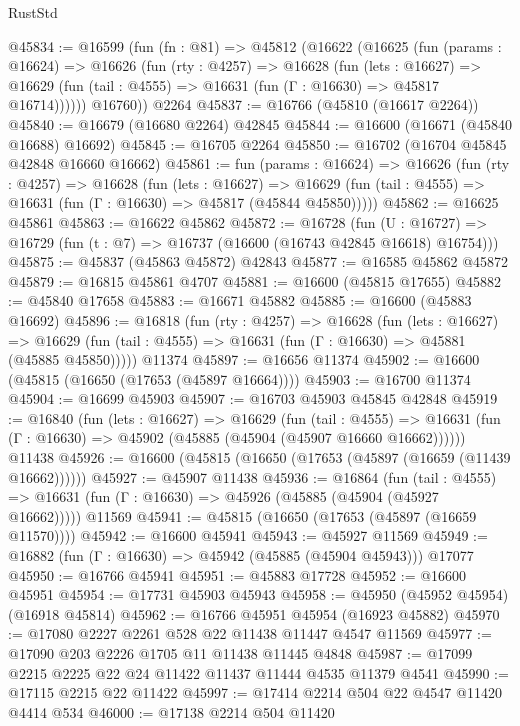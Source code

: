 \begin{lexlean}{RustStd}
\begin{coremodule}
{\begin{coremodule}
{{{{{{{{{{{{{{{{{{{{{{{{{{{{{{{{{{{{{{{{{{{{{{{{{{{{{{{@45834 := @16599
    (fun (fn : @81) =>
    @45812
      (@16622
        (@16625
          (fun (params : @16624) =>
          @16626
            (fun (rty : @4257) =>
            @16628
              (fun (lets : @16627) =>
              @16629 (fun (tail : @4555) => @16631 (fun (Γ : @16630) => @45817 @16714))))))
        @16760))
    @2264
@45837 := @16766 (@45810 (@16617 @2264))
@45840 := @16679 (@16680 @2264) @42845
@45844 := @16600 (@16671 (@45840 @16688) @16692)
@45845 := @16705 @2264
@45850 := @16702 (@16704 @45845 @42848 @16660 @16662)
@45861 := fun (params : @16624) =>
  @16626
    (fun (rty : @4257) =>
    @16628
      (fun (lets : @16627) =>
      @16629 (fun (tail : @4555) => @16631 (fun (Γ : @16630) => @45817 (@45844 @45850)))))
@45862 := @16625 @45861
@45863 := @16622 @45862
@45872 := @16728
    (fun (U : @16727) => @16729 (fun (t : @7) => @16737 (@16600 (@16743 @42845 @16618) @16754)))
@45875 := @45837 (@45863 @45872) @42843
@45877 := @16585 @45862 @45872
@45879 := @16815 @45861 @4707
@45881 := @16600 (@45815 @17655)
@45882 := @45840 @17658
@45883 := @16671 @45882
@45885 := @16600 (@45883 @16692)
@45896 := @16818
    (fun (rty : @4257) =>
    @16628
      (fun (lets : @16627) =>
      @16629 (fun (tail : @4555) => @16631 (fun (Γ : @16630) => @45881 (@45885 @45850)))))
    @11374
@45897 := @16656 @11374
@45902 := @16600 (@45815 (@16650 (@17653 (@45897 @16664))))
@45903 := @16700 @11374
@45904 := @16699 @45903
@45907 := @16703 @45903 @45845 @42848
@45919 := @16840
    (fun (lets : @16627) =>
    @16629
      (fun (tail : @4555) =>
      @16631 (fun (Γ : @16630) => @45902 (@45885 (@45904 (@45907 @16660 @16662))))))
    @11438
@45926 := @16600 (@45815 (@16650 (@17653 (@45897 (@16659 (@11439 @16662))))))
@45927 := @45907 @11438
@45936 := @16864
    (fun (tail : @4555) => @16631 (fun (Γ : @16630) => @45926 (@45885 (@45904 (@45927 @16662)))))
    @11569
@45941 := @45815 (@16650 (@17653 (@45897 (@16659 @11570))))
@45942 := @16600 @45941
@45943 := @45927 @11569
@45949 := @16882 (fun (Γ : @16630) => @45942 (@45885 (@45904 @45943))) @17077
@45950 := @16766 @45941
@45951 := @45883 @17728
@45952 := @16600 @45951
@45954 := @17731 @45903 @45943
@45958 := @45950 (@45952 @45954) (@16918 @45814)
@45962 := @16766 @45951 @45954 (@16923 @45882)
@45970 := @17080 @2227 @2261 @528 @22 @11438 @11447 @4547 @11569
@45977 := @17090 @203 @2226 @1705 @11 @11438 @11445 @4848
@45987 := @17099 @2215 @2225 @22 @24 @11422 @11437 @11444 @4535 @11379 @4541
@45990 := @17115 @2215 @22 @11422
@45997 := @17414 @2214 @504 @22 @4547 @11420 @4414 @534
@46000 := @17138 @2214 @504 @11420
}}}}}}}}}}}}}}}}}}}}}}}}}}}}}}}}}}}}}}}}}}}}}}}}}}}}}}}
\end{coremodule}}
\end{coremodule}
\end{lexlean}
